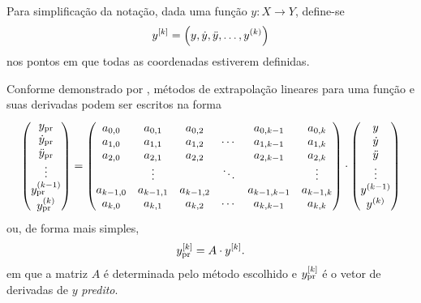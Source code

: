 Para simplificação da notação, dada uma função \(y: X\to Y\), define-se
\[\drvec{\taylorOrder}{y} = \pqty{y, \deriv{1}{y}, \deriv{2}{y}, \dots, \deriv{\taylorOrder}{y}}\]
nos pontos em que todas as coordenadas estiverem definidas.

Conforme demonstrado por , métodos de extrapolação lineares para uma função e suas derivadas podem ser escritos na forma
\[
\begin{pmatrix}
	\predicted{y} \\
	\predicted{\deriv{1}{y}} \\
	\predicted{\deriv{2}{y}} \\
	\vdots \\
	\predicted{\deriv{\taylorOrder-1}{y}} \\
	\predicted{\deriv{\taylorOrder}{y}}
\end{pmatrix}
=
\begin{pmatrix}
	a_{0,0} & a_{0,1} & a_{0,2} &  & a_{0,\taylorOrder-1} & a_{0,\taylorOrder} \\
	a_{1,0} & a_{1,1} & a_{1,2} & \cdots & a_{1,\taylorOrder-1} & a_{1,\taylorOrder} \\
	a_{2,0} & a_{2,1} & a_{2,2} &  & a_{2,\taylorOrder-1} & a_{2,\taylorOrder} \\
     & \vdots & & \ddots & & \vdots \\
    a_{\taylorOrder-1,0} & a_{\taylorOrder-1,1} & a_{\taylorOrder-1,2} &  & a_{\taylorOrder-1,\taylorOrder-1} & a_{\taylorOrder-1,\taylorOrder} \\
    a_{\taylorOrder,0} & a_{\taylorOrder,1} & a_{\taylorOrder,2} & \cdots & a_{\taylorOrder,\taylorOrder-1} & a_{\taylorOrder,\taylorOrder}
\end{pmatrix}
\cdot
\begin{pmatrix}
	y \\
	\deriv{1}{y} \\
	\deriv{2}{y} \\
	\vdots \\
	\deriv{\taylorOrder-1}{y} \\
	\deriv{\taylorOrder}{y}
\end{pmatrix}
\]
ou, de forma mais simples,
\begin{equation}
	\drvec{\taylorOrder}{\predicted{y}} = A \cdot \drvec{\taylorOrder}{y}.
\end{equation}
em que a matriz \(A\) é determinada pelo método escolhido e \(\drvec{\taylorOrder}{\predicted{y}}\) é o vetor de derivadas de \(y\) \textit{predito}.

